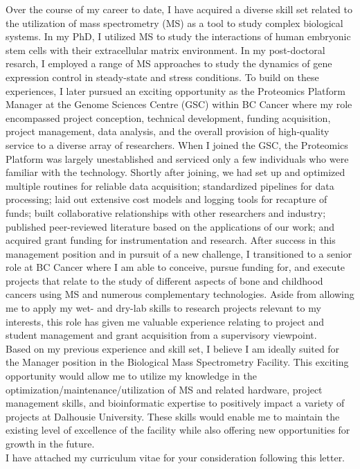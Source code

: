 \documentclass[11pt]{article}
\begin{document}
\noindent
Over the course of my career to date, I have acquired a diverse skill set related to the utilization of mass spectrometry (MS) as a tool to study complex biological systems. In my PhD, I utilized MS to study the interactions of human embryonic stem cells with their extracellular matrix environment. In my post-doctoral resarch, I employed a range of MS approaches to study the dynamics of gene expression control in steady-state and stress conditions. To build on these experiences, I later pursued an exciting opportunity as the Proteomics Platform Manager at the Genome Sciences Centre (GSC) within BC Cancer where my role encompassed project conception, technical development, funding acquisition, project management, data analysis, and the overall provision of high-quality service to a diverse array of researchers. When I joined the GSC, the Proteomics Platform was largely unestablished and serviced only a few individuals who were familiar with the technology. Shortly after joining, we had set up and optimized multiple routines for reliable data acquisition; standardized pipelines for data processing; laid out extensive cost models and logging tools for recapture of funds; built collaborative relationships with other researchers and industry; published peer-reviewed literature based on the applications of our work; and acquired grant funding for instrumentation and research. After success in this management position and in pursuit of a new challenge, I transitioned to a senior role at BC Cancer where I am able to conceive, pursue funding for, and execute projects that relate to the study of different aspects of bone and childhood cancers using MS and numerous complementary technologies. Aside from allowing me to apply my wet- and dry-lab skills to research projects relevant to my interests, this role has given me valuable experience relating to project and student management and grant acquisition from a supervisory viewpoint.\\

\noindent
Based on my previous experience and skill set, I believe I am ideally suited for the Manager position in the Biological Mass Spectrometry Facility. This exciting opportunity would allow me to utilize my knowledge in the optimization/maintenance/utilization of MS and related hardware, project management skills, and bioinformatic expertise to positively impact a variety of projects at Dalhousie University. These skills would enable me to maintain the existing level of excellence of the facility while also offering new opportunities for growth in the future.\\

\noindent
I have attached my curriculum vitae for your consideration following this letter.
\end{document}

